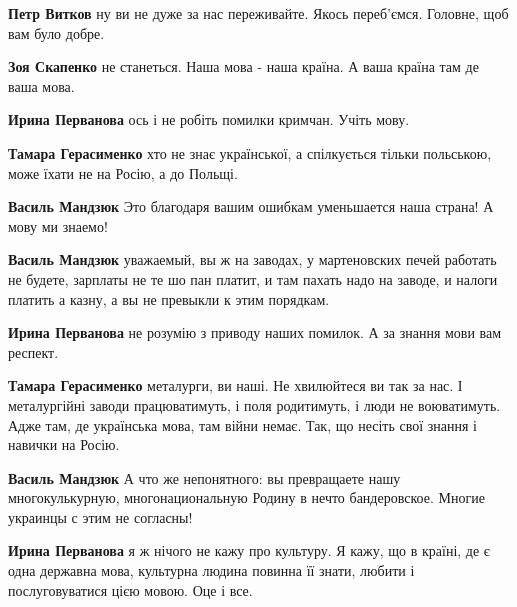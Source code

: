 \begin{itemize}
\begin{itemize}
\textbf{Петр Витков} ну ви не дуже за нас переживайте. Якось переб'ємся. Головне, щоб вам було добре.

\textbf{Зоя Скапенко} не станеться. Наша мова - наша країна. А ваша країна там де ваша мова.

\textbf{Ирина Перванова} ось і не робіть помилки кримчан. Учіть мову.

\textbf{Тамара Герасименко} хто не знає української, а спілкується тільки польською, може їхати не на Росію, а до Польщі.

\textbf{Василь Мандзюк} Это благодаря вашим ошибкам уменьшается наша страна! А мову ми знаемо!

\textbf{Василь Мандзюк} уважаемый, вы ж на заводах, у мартеновских печей работать не будете, зарплаты не те шо пан платит, и там пахать надо на заводе, и налоги платить а казну, а вы не превыкли к этим порядкам.

\textbf{Ирина Перванова} не розумію з приводу наших помилок. А за знання мови вам респект.

\textbf{Тамара Герасименко} металурги, ви наші. Не хвилюйтеся ви так за нас. І металургійні заводи працюватимуть, і поля родитимуть, і люди не воюватимуть. Адже там, де українська мова, там війни немає. Так, що несіть свої знання і навички на Росію.

\textbf{Василь Мандзюк} А что же непонятного: вы превращаете нашу многокулькурную, многонациональную Родину в нечто бандеровское. Многие украинцы с этим не согласны!

\textbf{Ирина Перванова} я ж нічого не кажу про культуру. Я кажу, що в країні, де є одна державна мова, культурна людина повинна її знати, любити і послуговуватися цією мовою. Оце і все.


\end{itemize}
\end{itemize}
